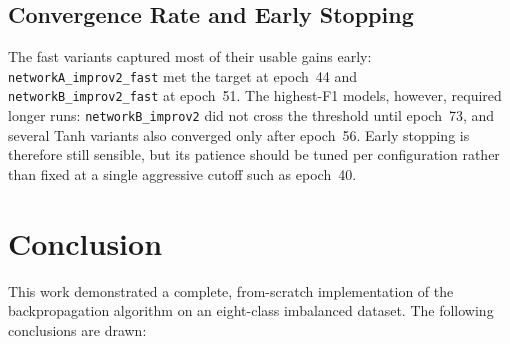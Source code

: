 \documentclass{acm_proc_article-sp}
\begin{document}
\subsection{Convergence Rate and Early Stopping}

The fast variants captured most of their usable gains early:
\texttt{networkA\_improv2\_fast} met the target at epoch~44 and
\texttt{networkB\_improv2\_fast} at epoch~51.  The highest-F1 models,
however, required longer runs: \texttt{networkB\_improv2} did not cross
the threshold until epoch~73, and several Tanh variants also converged
only after epoch~56.  Early stopping is therefore still sensible, but
its patience should be tuned per configuration rather than fixed at a
single aggressive cutoff such as epoch~40.

\section{Conclusion}

This work demonstrated a complete, from-scratch implementation of the
backpropagation algorithm on an eight-class imbalanced dataset.  The
following conclusions are drawn:
\end{document}
